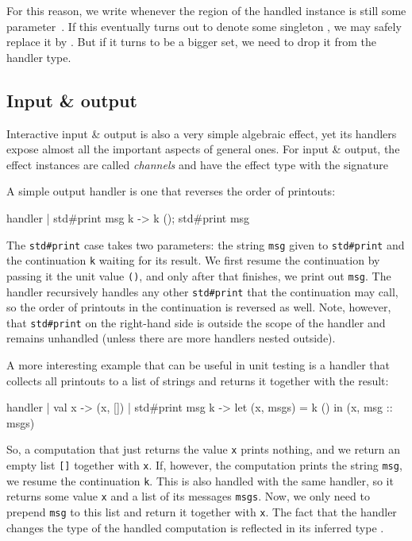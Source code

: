 \documentclass{LMCS}
\let\inline\lstinline
\begin{document}
For this reason, we write  whenever the region of the handled instance is still some parameter~.
If this eventually turns out to denote some singleton , we may safely replace it by .
But if it turns to be a bigger set, we need to drop it from the handler type.


\subsection{Input \& output}

Interactive input \& output is also a very simple algebraic effect,
yet its handlers expose almost all the important aspects of general ones.
For input \& output, the effect instances are called \emph{channels}
and have the effect type  with the signature

A simple output handler is one that reverses the order of printouts:
\begin{source}
  handler
  | std#print msg k -> k (); std#print msg
\end{source}
The \inline{std#print} case takes two parameters:
  the string \inline{msg} given to \inline{std#print} and
  the continuation \inline{k} waiting for its result.
We first resume the continuation by passing it the unit value \inline{()},
and only after that finishes, we print out \inline{msg}.
The handler recursively handles any other \inline{std#print} that the continuation may call,
so the order of printouts in the continuation is reversed as well.
Note, however, that \inline{std#print} on the right-hand side is outside the scope of the handler
and remains unhandled (unless there are more handlers nested outside).

A more interesting example that can be useful in unit testing is a handler that
collects all printouts to a list of strings and returns it together with the result:
\begin{source}
  handler
  | val x -> (x, [])
  | std#print msg k ->
      let (x, msgs) = k () in
      (x, msg :: msgs)
\end{source}
So, a computation that just returns the value \inline{x} prints nothing,
and we return an empty list \inline{[]} together with \inline{x}.
If, however, the computation prints the string \inline{msg},
we resume the continuation \inline{k}.
This is also handled with the same handler, so it returns some value \inline{x}
and a list of its messages \inline{msgs}.
Now, we only need to prepend \inline{msg} to this list and return it together with \inline{x}.
The fact that the handler changes the type of the handled computation is reflected in its inferred type
.
\end{document}
